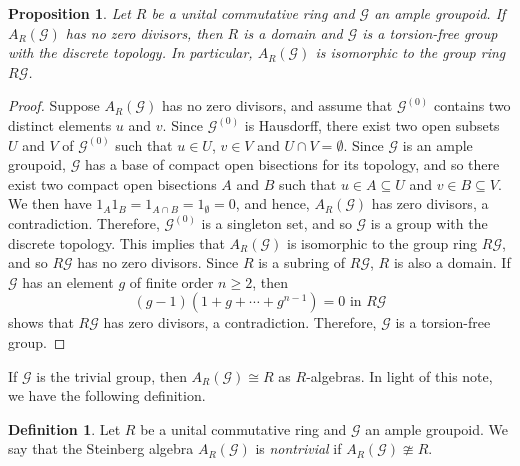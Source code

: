 \documentclass[a4paper, 11pt, reqno]{amsart}
\newtheorem{prop}[thm]{Proposition}
\theoremstyle{definition}
\newtheorem{defn}[thm]{Definition}
\def\mG{\mathcal{G}}
\begin{document}
\begin{prop}\label{domain}
Let $R$ be a unital commutative ring and $\mG$ an ample groupoid. If $A_R(\mG)$ has no zero divisors, then $R$ is a domain and $\mG$ is a torsion-free group with the discrete topology. In particular, $A_R(\mG)$ is isomorphic to the group ring $R\mG$.
\end{prop}
\begin{proof}
Suppose  $A_R(\mG)$	has no zero divisors, and assume that $\mathcal{G}^{(0)}$ contains two distinct elements $u$ and $v$. Since  $\mathcal{G}^{(0)}$ is Hausdorff, there exist two open subsets $U$ and $V$
of  $\mathcal{G}^{(0)}$ such that $u\in U$, $v\in V$ and $U \cap V = \emptyset$. Since $\mathcal{G}$ is an ample groupoid, $\mathcal{G}$ has a base of compact open bisections for its topology, and so there exist two compact open bisections $A$ and $B$ such that $u\in A\subseteq U$ and $v\in B\subseteq V$. We then have $1_A  1_B = 1_{A \cap B} = 1_{\emptyset} =0$, and hence, $A_R(\mathcal{G})$ has zero divisors,  a contradiction. Therefore,  $\mathcal{G}^{(0)}$ is a singleton set, and so  $\mathcal{G}$ is a group with the discrete topology. This implies that $A_R(\mG)$ is isomorphic to the group ring $R\mG$, and so  $R\mG$ has no zero divisors. Since $R$ is a subring of $R\mG$, $R$ is also a domain. If $\mG$ has an element $g$ of finite order $n\ge 2$, then $$(g-1)(1 + g + \cdots + g^{n-1})=0 \text{ in } R\mG$$ shows that $R\mG$ has zero divisors, a contradiction. Therefore, $\mG$ is a torsion-free group. 
\end{proof}

If $\mG$ is the trivial group, then $A_R(\mG) \cong R$ as $R$-algebras. In light of this note, we have the following definition.

\begin{defn}
Let $R$ be a unital commutative ring and $\mG$ an ample groupoid. We say that the Steinberg algebra $A_R(\mG)$ is {\it nontrivial}	if $A_R(\mG)\ncong R$.
\end{defn}
\end{document}
